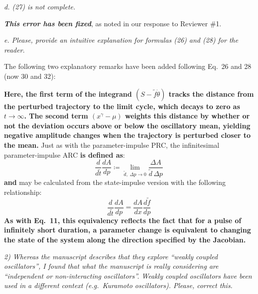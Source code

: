 \documentclass[11pt, letterpaper]{article}
\newenvironment{reviewer}{\itshape\color{gray}}{}
\newenvironment{manuscript}[1]{\begin{center}\begin{tcolorbox}[colback=green!5!white,colframe=green!75!black,width=0.8\textwidth,title={#1},breakable,fonttitle=\bfseries]}{\end{tcolorbox}\end{center}}
\begin{document}
\begin{reviewer}
d. (27) is not complete.
\end{reviewer}

{\itshape\bfseries This error has been fixed}, as noted in our response to Reviewer \#1.

\begin{reviewer}
e. Please, provide an intuitive explanation for formulas (26) and (28) for the reader. 
\end{reviewer}

The following two explanatory remarks have been added following Eq.~26 and 28 (now 30 and 32):

\begin{manuscript}{Page 10}
  {\bfseries Here, the first term of the integrand $(S - \tilde{f}\dot{\theta})$ tracks the distance from the perturbed trajectory to the limit cycle, which decays to zero as $t \to \infty$.
The second term $(x^\gamma - \mu)$ weights this distance by whether or not the deviation occurs above or below the oscillatory mean, yielding negative amplitude changes when the trajectory is perturbed closer to the mean.}
Just as with the parameter-impulse PRC, the infinitesimal parameter-impulse ARC {\bfseries is defined as}:
\begin{equation}
  \frac{d}{d\tilde{t}}\frac{dA}{dp} \coloneqq \lim_{\tilde{d},\; \Delta p \to 0}
  \frac{\Delta A}{\tilde{d}\, \Delta p}
  \tag{31}
\end{equation}
{\bfseries and} may be calculated from the state-impulse version with the following relationship:
\begin{equation}
  \frac{d}{d\tilde{t}}\frac{dA}{dp} = \frac{dA}{dx}\frac{d\tilde{f}}{dp}
  \tag{32}
\end{equation}
{\bfseries As with Eq.~11, this equivalency reflects the fact that for a pulse of infinitely short duration, a parameter change is equivalent to changing the state of the system along the direction specified by the Jacobian.}
\end{manuscript}

\begin{reviewer}
2) Whereas the manuscript describes that they explore ``weakly coupled oscillators'', I found that what the manuscript is really considering are ``independent or non-interacting oscillators''.
Weakly coupled oscillators have been used in a different context (e.g.\ Kuramoto oscillators).
Please, correct this.
\end{reviewer}
 
\end{document}
